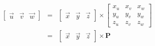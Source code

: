 \documentclass[12pt]{article}
\begin{document}
    \begin{eqnarray*}
        \left[ \begin{array}{ccc} \overrightarrow{u} & \overrightarrow{v} & \overrightarrow{w} \end{array} \right] &
        = &
        \left[ \begin{array}{ccc} \overrightarrow{x} & \overrightarrow{y} & \overrightarrow{z} \end{array} \right]
        \times
        \left[ \begin{array}{ccc}
            x_u & x_v & x_w \\
            y_u & y_v & y_w \\
            z_u & z_v & z_w
        \end{array} \right] \\
        & = &
        \left[ \begin{array}{ccc} \overrightarrow{x} & \overrightarrow{y} & \overrightarrow{z} \end{array} \right]
        \times
        \textbf{P}
    \end{eqnarray*}
\end{document}
